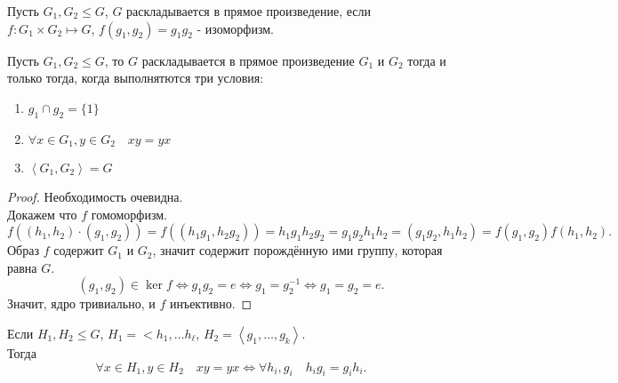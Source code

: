 \documentclass[11pt, oneside]{article}   	%
\begin{document}
    \begin{definition}
        Пусть $G_1, G_2 \le G$, $G$ раскладывается в прямое произведение, если $f : G_1 \times G_2 \mapsto G$, $f(g_1, g_2) = g_1g_2$ - изоморфизм.

    \end{definition}
    \begin{theorem}
        Пусть $G_1, G_2 \le G$, то $G$ раскладывается в прямое произведение $G_1$ и $G_2$ тогда и только тогда, когда выполнятются три условия:
        \begin{enumerate}
            \item $g_1\cap g_2 = \{1\} $ 
            \item $\forall{x\in G_1, y\in G_2}\quad xy = yx$
            \item $\left<G_1, G_2\right> = G$
        \end{enumerate}
        \begin{proof}
            Необходимость очевидна.\\
            Докажем что $f$ гомоморфизм.\\
            \[ f((h_1, h_2) \cdot (g_1, g_2)) = f((h_1g_1, h_2g_2)) = h_1g_1h_2g_2 = g_1g_2h_1h_2 = (g_1g_2, h_1h_2) = f(g_1, g_2)f(h_1, h_2) .\]
            Образ $f$ содержит  $G_1$ и $G_2$, значит содержит порождённую ими группу, которая равна $G$. \\
            \[ (g_1, g_2)\in \ker f \iff g_1g_2 = e \iff g_1 = g_2^{-1} \iff g_1 = g_2 = e .\]
            Значит, ядро тривиально, и $f$ инъективно.
        \end{proof}
    \end{theorem}
    \begin{theorem}
        Если $H_1, H_2 \le G$, $H_1 = <h_1, \ldots h_{\ell}$, $H_2 = \left<g_1, \ldots, g_k\right>$.\\
        Тогда
        \[ \forall{x\in H_1, y\in H_2}\quad xy=yx \iff \forall{h_i, g_i}\quad h_ig_i = g_ih_i  .\] 
    \end{theorem}
\end{document}
